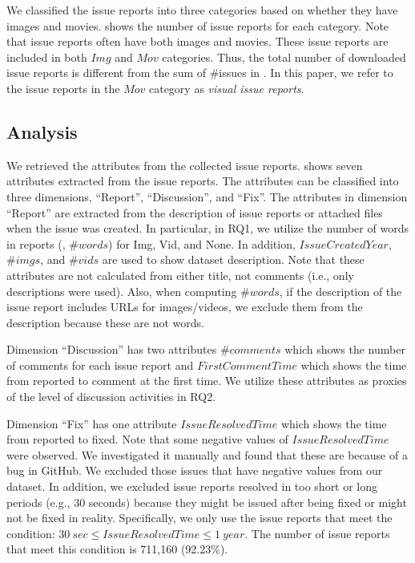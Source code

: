 
We classified the issue reports into three categories based on whether they have images and movies.  shows the number of issue reports for each category. 
Note that issue reports often have both images and movies. 
These issue reports are included in both $Img$ and $Mov$ categories. 
Thus, the total number of downloaded issue reports is different from 
the sum of \#issues in . 
In this paper, we refer to the issue reports in the $Mov$ category 
as \textit{visual issue reports}. 


% 
%

\subsection{Analysis}
We retrieved the attributes from the collected issue reports.
 shows seven attributes extracted from 
the issue reports. 
The attributes can be classified into three dimensions, 
``Report'', ``Discussion'', and ``Fix''. 
The attributes in dimension ``Report'' are extracted from 
the description of issue reports or attached files 
when the issue was created. 
In particular, in RQ1, we 
utilize the number of words 
in reports 
(\ie, $\#words$) 
for Img, Vid, and None. 
In addition, 
$IssueCreatedYear$, $\#imgs$, and $\#vids$ are used to show 
dataset description. 
Note that these attributes are not calculated from either title, not comments (i.e., only descriptions were used). 
Also, when computing $\#words$, if the description of the issue report 
includes URLs for images/videos, 
we exclude them from the description because these are not words.

Dimension ``Discussion''
has two attributes $\#comments$ 
which shows the number of comments for each issue report and 
$FirstCommentTime$ which shows the time from 
reported to comment at the first time.
We utilize these attributes as proxies of the level of 
discussion activities in RQ2.

Dimension ``Fix'' has one attribute $IssueResolvedTime$ which shows the time from reported to fixed. 
Note that some negative values of $IssueResolvedTime$ were observed. We investigated it manually and found that these are because of a bug in GitHub.  We excluded those issues that have negative values from our dataset. 
In addition, we excluded issue reports resolved in too short or long periods (e.g., 30 seconds) because they might be issued after being fixed or might not be fixed in reality.
Specifically, we only use the issue reports that meet the condition: $30\ sec \leq IssueResolvedTime \leq 1\ year$.
The number of issue reports that meet this condition is 711,160 (92.23\%).


